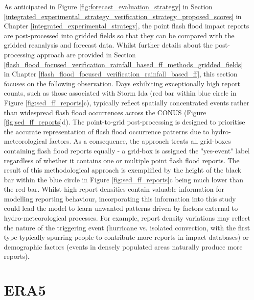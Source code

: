 As  anticipated in Figure \ref{fig:forecast_evaluation_strategy} in Section \ref{integrated_experimental_strategy_verification_strategy_proposed_scores} in Chapter \ref{integrated_experimental_strategy}, the point flash flood impact reports are post-processed into gridded fields so that they can be compared with the gridded reanalysis and forecast data. Whilst further details about the post-processing approach are provided in Section \ref{flash_flood_focused_verification_rainfall_based_ff_methods_gridded_fields} in Chapter \ref{flash_flood_focused_verification_rainfall_based_ff}, this section focuses on the following observation. Days exhibiting exceptionally high report counts, such as those associated with Storm Ida (red bar within blue circle in Figure \ref{fig:sed_ff_reports}c), typically reflect spatially concentrated events rather than widespread flash flood occurrences across the CONUS (Figure \ref{fig:sed_ff_reports}d). The point-to-grid post-processing is designed to prioritise the accurate representation of flash flood occurrence patterns due to hydro-meteorological factors. As a consequence, the approach treats all grid-boxes containing flash flood reports equally - a grid-box is assigned the "yes-event" label regardless of whether it contains one or multiple point flash flood reports. The result of this methodological approach is exemplified by the height of the black bar within the blue circle in Figure \ref{fig:sed_ff_reports}c being much lower than the red bar. Whilst high report densities contain valuable information for modelling reporting behaviour, incorporating this information into this study could lead the model to learn unwanted patterns driven by factors external to hydro-meteorological processes. For example, report density variations may reflect the nature of the triggering event (hurricane vs. isolated convection, with the first type typically spurring people to contribute more reports in impact databases) or demographic factors (events in densely populated areas naturally produce more reports). 


\section{ERA5}
\label{datasets_era5}

